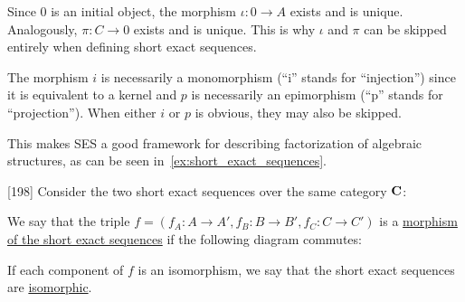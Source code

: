 \begin{note}\label{note:short_exact_sequence_factorization}
  Since $0$ is an initial object, the morphism $\iota: 0 \to A$ exists and is unique. Analogously, $\pi: C \to 0$ exists and is unique. This is why $\iota$ and $\pi$ can be skipped entirely when defining short exact sequences.

  The morphism $i$ is necessarily a monomorphism (\enquote{i} stands for \enquote{injection}) since it is equivalent to a kernel and $p$ is necessarily an epimorphism (\enquote{p} stands for \enquote{projection}). When either $i$ or $p$ is obvious, they may also be skipped.

  This makes SES a good framework for describing factorization of algebraic structures, as can be seen in~\cref{ex:short_exact_sequences}.
\end{note}

\begin{definition}\label{def:exact_sequence_morphisms}\cite{MacLane1994}[198]
  Consider the two short exact sequences over the same category $\operatorname{\mathbf{C}}$:
  \begin{center}
  \end{center}
  We say that the triple $f = (f_A: A \to A', f_B: B \to B', f_C: C \to C')$ is a \uline{morphism of the short exact sequences} if the following diagram commutes:
  \begin{center}
  \end{center}

  If each component of $f$ is an isomorphism, we say that the short exact sequences are \uline{isomorphic}.
\end{definition}

